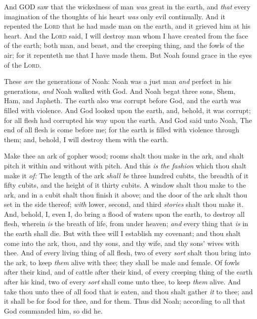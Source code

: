 \documentclass[11pt,letterpaper,oneside]{memoir}
\begin{document}
And GOD saw that the wickedness of man \emph{was} great in the earth,
and \emph{that} every imagination of the thoughts of his heart
\emph{was} only evil continually. And it repented the \textsc{Lord} that
he had made man on the earth, and it grieved him at his heart. And the
\textsc{Lord} said, I will destroy man whom I have created from the face
of the earth; both man, and beast, and the creeping thing, and the fowls
of the air; for it repenteth me that I have made them. But Noah found
grace in the eyes of the \textsc{Lord}.

These \emph{are} the generations of Noah: Noah was a just man \emph{and}
perfect in his generations, \emph{and} Noah walked with God. And Noah
begat three sons, Shem, Ham, and Japheth. The earth also was corrupt
before God, and the earth was filled with violence. And God looked upon
the earth, and, behold, it was corrupt; for all flesh had corrupted his
way upon the earth. And God said unto Noah, The end of all flesh is come
before me; for the earth is filled with violence through them; and,
behold, I will destroy them with the earth.

Make thee an ark of gopher wood; rooms shalt thou make in the ark, and
shalt pitch it within and without with pitch. And this \emph{is the
fashion} which thou shalt make it \emph{of:} The length of the ark
\emph{shall be} three hundred cubits, the breadth of it fifty cubits,
and the height of it thirty cubits. A window shalt thou make to the ark,
and in a cubit shalt thou finish it above; and the door of the ark shalt
thou set in the side thereof; \emph{with} lower, second, and third
\emph{stories} shalt thou make it. And, behold, I, even I, do bring a
flood of waters upon the earth, to destroy all flesh, wherein \emph{is}
the breath of life, from under heaven; \emph{and} every thing that
\emph{is} in the earth shall die. But with thee will I establish my
covenant; and thou shalt come into the ark, thou, and thy sons, and thy
wife, and thy sons' wives with thee. And of every living thing of all
flesh, two of every \emph{sort} shalt thou bring into the ark, to keep
\emph{them} alive with thee; they shall be male and female. Of fowls
after their kind, and of cattle after their kind, of every creeping
thing of the earth after his kind, two of every \emph{sort} shall come
unto thee, to keep \emph{them} alive. And take thou unto thee of all
food that is eaten, and thou shalt gather \emph{it} to thee; and it
shall be for food for thee, and for them. Thus did Noah; according to
all that God commanded him, so did he.
\end{document}
